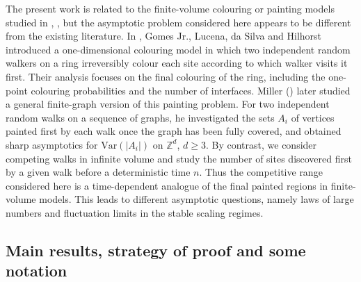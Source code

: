 \documentclass[10pt,a4paper]{amsart}
\newcommand{\1}{\mathds{1}}
\newcommand{\ZZ}{\mathbb Z}
\newcommand{\Var}{\mathrm{Var}}
\numberwithin{equation}{section}
\begin{document}
The present work is related to the finite-volume colouring or painting models studied in \cite{JuniorLucenaSilvaHilhorst1996}, \cite{Miller2010PaintingAG},
but the asymptotic problem considered here appears to be different from the existing literature. In \cite{JuniorLucenaSilvaHilhorst1996}, Gomes Jr., Lucena, da Silva and Hilhorst introduced a one-dimensional colouring
model in which two independent random walkers on a ring irreversibly colour each site according to which walker visits it first. Their analysis focuses on the final colouring of the ring,
including the one-point colouring probabilities and the number of interfaces.
Miller (\cite{Miller2010PaintingAG}) later studied a general finite-graph version of this painting problem. For two independent random walks on a sequence of graphs, he investigated the sets $A_i$ of vertices painted
first by each walk once the graph has been fully covered, and obtained sharp asymptotics for
$\Var(|A_i|)$ on $\ZZ^d$, $d\ge3$. By contrast, we consider competing walks in infinite volume and study the number of sites
discovered first by a given walk before a deterministic time $n$. Thus the competitive range
considered here is a time-dependent analogue of the final painted regions in finite-volume
models. This leads to different asymptotic questions, namely laws of large numbers and fluctuation limits in the stable scaling regimes.

\subsection{Main results, strategy of proof and some notation}
\label{susbection:main results, strategy of proof}
\end{document}
